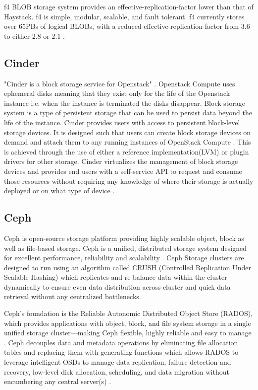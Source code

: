{     f4 BLOB storage system provides an effective-replication-factor
     lower than that of Haystack. f4 is simple, modular, scalable, and
     fault tolerant. f4 currently stores over 65PBs of logical BLOBs,
     with a reduced effective-replication-factor from 3.6 to either
     2.8 or 2.1 \cite{paper-f4}.

     
\subsection{Cinder}
      
     "Cinder is a block storage service for Openstack"
     \cite{wiki-Cinder}. Openstack Compute uses ephemeral disks
     meaning that they exist only for the life of the Openstack
     instance i.e. when the instance is terminated the disks
     disappear. Block storage system is a type of persistent storage
     that can be used to persist data beyond the life of the
     instance. Cinder provides users with access to persistent
     block-level storage devices. It is designed such that users can
     create block storage devices on demand and attach them to any
     running instances of OpenStack Compute \cite{book-Cinder}. This
     is achieved through the use of either a reference
     implementation(LVM) or plugin drivers for other storage. Cinder
     virtualizes the management of block storage devices and provides
     end users with a self-service API to request and consume those
     resources without requiring any knowledge of where their storage
     is actually deployed or on what type of device
     \cite{wiki-Cinder}.
     
\subsection{Ceph }

     Ceph is open-source storage platform providing highly scalable
     object, block as well as file-based storage. Ceph is a unified,
     distributed storage system designed for excellent performance,
     reliability and scalability \cite{www-ceph}. Ceph Storage
     clusters are designed to run using an algorithm called CRUSH
     (Controlled Replication Under Scalable Hashing) which replicates
     and re-balance data within the cluster dynamically to ensure even
     data distribution across cluster and quick data retrieval without
     any centralized bottlenecks.
 
     Ceph’s foundation is the Reliable Autonomic Distributed Object
     Store (RADOS), which provides applications
     with object, block, and file system storage in a single unified
     storage cluster—making Ceph flexible, highly reliable and easy to
     manage \cite{www-cepharch}. Ceph decouples data and metadata operations by
     eliminating file allocation tables and replacing them with
     generating functions which allows RADOS to leverage intelligent
     OSDs to manage data replication, failure detection and recovery,
     low-level disk allocation, scheduling, and data migration without
     encumbering any central server(s) \cite{paper-Ceph}.
 
}
